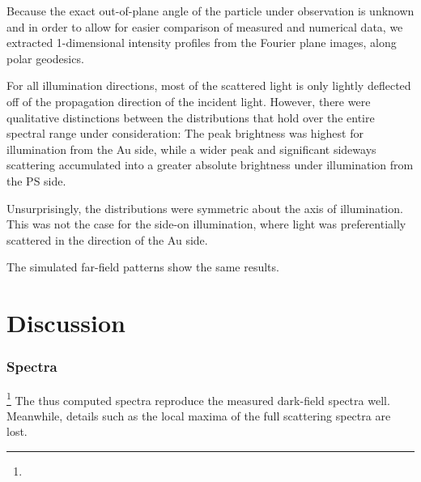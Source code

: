 \documentclass[10pt]{article}
\begin{document}
Because the exact out-of-plane angle of the particle under observation is unknown and in order to allow for easier comparison of measured and numerical data, we extracted 1-dimensional intensity profiles from the Fourier plane images, along polar geodesics. 

For all illumination directions, most of the scattered light is only lightly deflected off of the propagation direction of the incident light. 
However, there were qualitative distinctions between the distributions that hold over the entire spectral range under consideration:
The peak brightness was highest for illumination from the Au side, while a wider peak and significant sideways scattering accumulated into a greater absolute brightness under illumination from the PS side. 

Unsurprisingly, the distributions were symmetric about the axis of illumination. 
This was not the case for the side-on illumination, where light was preferentially scattered in the direction of the Au side. 









The simulated far-field patterns show the same results. 










\section*{Discussion}

\subsubsection*{Spectra}

\footnote{} 
The thus computed spectra reproduce the measured dark-field spectra well. 
Meanwhile, details such as the local maxima of the full scattering spectra are lost. 
\end{document}
